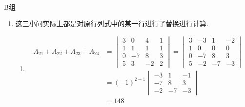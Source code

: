 \centerline{\heiti B组}
\begin{enumerate}
    \item 这三小问实际上都是对原行列式中的某一行进行了替换进行计算.
          \begin{enumerate}
              \item \begin{align*}
                        A_{21}+A_{22}+A_{23}+A_{24}
                         & = \begin{vmatrix}
                                 3 & 0  & 4  & 1 \\
                                 1 & 1  & 1  & 1 \\
                                 0 & -7 & 8  & 3 \\
                                 5 & 3  & -2 & 2
                             \end{vmatrix}
                        = \begin{vmatrix}
                              3 & -3 & 1  & -2 \\
                              1 & 0  & 0  & 0  \\
                              0 & -7 & 8  & 3  \\
                              5 & -2 & -7 & -3
                          \end{vmatrix}             \\
                         & = (-1)^{2+1} \begin{vmatrix}
                                            -3 & 1  & -1 \\
                                            -7 & 8  & 3  \\
                                            -2 & -7 & -3
                                        \end{vmatrix} \\
                         & = 148
                    \end{align*}


\end{enumerate}
\end{enumerate}
